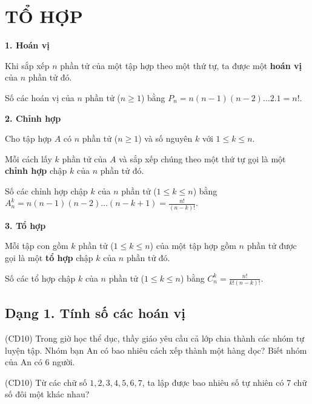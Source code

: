 \documentclass[12pt,a4paper]{article}
\begin{document}
\section{TỔ HỢP}

\begin{dn}
\textbf{1. Hoán vị}

Khi sắp xếp $n$ phần tử của một tập hợp theo một thứ tự, ta được một \textbf{hoán vị} của $n$ phần tử đó.

Số các hoán vị của $n$ phần tử ($n \ge 1$) bằng $P_n = n(n-1)(n-2)\dots 2.1 = n!$.
\end{dn}

\begin{dn}
\textbf{2. Chỉnh hợp}

Cho tập hợp $A$ có $n$ phần tử ($n \ge 1$) và số nguyên $k$ với $1 \le k \le n$.

Mỗi cách lấy $k$ phần tử của $A$ và sắp xếp chúng theo một thứ tự gọi là một \textbf{chỉnh hợp} chập $k$ của $n$ phần tử đó.

Số các chỉnh hợp chập $k$ của $n$ phần tử ($1 \le k \le n$) bằng $A_n^k = n(n-1)(n-2)\dots(n-k+1) = \frac{n!}{(n-k)!}$.
\end{dn}

\begin{dn}
\textbf{3. Tổ hợp}

Mỗi tập con gồm $k$ phần tử ($1 \le k \le n$) của một tập hợp gồm $n$ phần tử được gọi là một \textbf{tổ hợp} chập $k$ của $n$ phần tử đó.

Số các tổ hợp chập $k$ của $n$ phần tử ($1 \le k \le n$) bằng $C_n^k = \frac{n!}{k!(n-k)!}$.
\end{dn}



\subsection{Dạng 1. Tính số các hoán vị}

\begin{ex}
(CD10) Trong giờ học thể dục, thầy giáo yêu cầu cả lớp chia thành các nhóm tự luyện tập. Nhóm bạn An có bao nhiêu cách xếp thành một hàng dọc? Biết nhóm của An có 6 người.
\end{ex}

\begin{ex}
(CD10) Từ các chữ số $1, 2, 3, 4, 5, 6, 7$, ta lập được bao nhiêu số tự nhiên có 7 chữ số đôi một khác nhau?
\end{ex}
\end{document}
